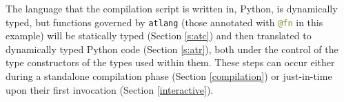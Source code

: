 \documentclass[9pt]{sigplanconf}
\newcommand{\lstinlinep}[1]{\lstinline[language=Python,basicstyle=\ttfamily\small,deletendkeywords={tuple,buffer,map}]{#1}}
\begin{document}

The language that the compilation script is written in, Python, is dynamically typed, but functions governed by \verb|atlang| (those annotated with \lstinlinep{@fn} in this example) will be statically typed (Section \ref{s:atc}) and then translated to dynamically typed Python code (Section \ref{s:atr}), both under the control of the type constructors of the types used within them. These steps can occur either during a standalone compilation phase (Section \ref{compilation}) or just-in-time upon their first invocation (Section \ref{interactive}).
\end{document}
